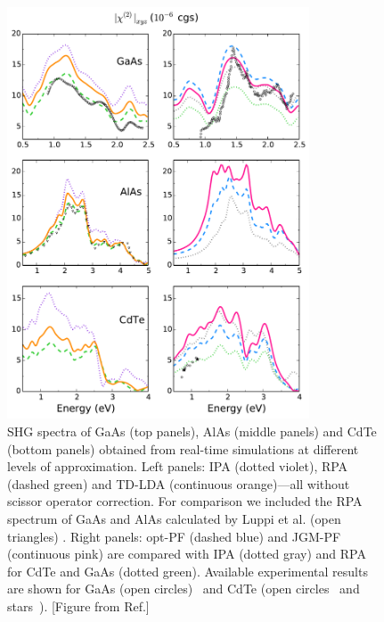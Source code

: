 \begin{figure}[H]
\centering  \includegraphics[width=0.8\textwidth]{Figures/SHG.pdf}
\caption{\footnotesize{SHG spectra of GaAs (top panels),  AlAs (middle panels) and CdTe (bottom panels) obtained from real-time simulations at different levels of approximation. Left panels: IPA (dotted violet), RPA (dashed green) and TD-LDA (continuous orange)---all without scissor operator correction. For comparison we included the RPA spectrum of GaAs and AlAs calculated by Luppi et al.\cite{PhysRevB.82.235201} (open triangles) \label{fg:shgblk}. Right panels: opt-PF (dashed blue) and JGM-PF (continuous pink) are compared with IPA (dotted gray) and RPA for CdTe and GaAs (dotted green). Available experimental results are shown for GaAs (open circles)~\cite{bergfeld2003second} and CdTe (open circles~\cite{Shoji:97} and stars~\cite{Jang:13}).\label{fg:shg} [Figure from Ref.\cite{gruningtddf1}] }}
\end{figure}

